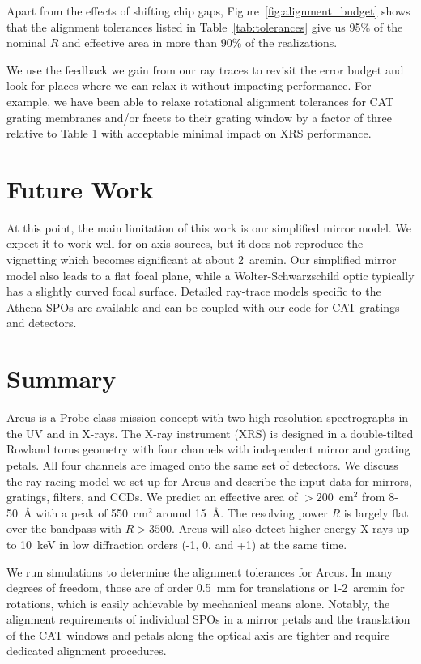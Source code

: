 \documentclass[12pt]{spieman}  %
\begin{document}
\begin{spacing}{2}
Apart from the effects of shifting chip gaps, Figure~\ref{fig:alignment_budget} shows that the alignment tolerances listed in Table~\ref{tab:tolerances} give us 95\% of the nominal $R$ and effective area in more than 90\% of the realizations.

We use the feedback we gain from our ray traces to revisit the error budget and look for places where we can relax it without impacting performance.
For example, we have been able to relaxe rotational alignment tolerances for CAT grating membranes and/or facets to their grating window by a factor of three relative to Table 1 with acceptable minimal impact on XRS performance.

\section{Future Work}
At this point, the main limitation of this work is our simplified mirror model. We expect it to work well for on-axis sources, but it does not reproduce the vignetting which becomes significant at about 2~arcmin. Our simplified mirror model also leads to a flat focal plane, while a Wolter-Schwarzschild optic typically has a slightly curved focal surface. Detailed ray-trace models specific to the Athena SPOs are available\cite{10.1117/12.2232230,10.1117/12.2594461,10.1117/12.2628133} and can be coupled with our code for CAT gratings and detectors.

\section{Summary}
\label{sect:summary}
Arcus is a Probe-class mission concept with two high-resolution spectrographs in the UV and in X-rays. The X-ray instrument (XRS) is designed in a double-tilted Rowland torus geometry with four channels with independent mirror and grating petals. All four channels are imaged onto the same set of detectors. We discuss the ray-racing model we set up for Arcus and describe the input data for mirrors, gratings, filters, and CCDs. We predict an effective area of $>200$~cm$^2$ from 8-50~\AA{} with a peak of 550~cm$^2$ around 15~\AA{}. The resolving power $R$ is largely flat over the bandpass with $R>3500$. Arcus will also detect higher-energy X-rays up to 10~keV in low diffraction orders (-1, 0, and +1) at the same time.

We run simulations to determine the alignment tolerances for Arcus. In many degrees of freedom, those are of order 0.5~mm for translations or 1-2~arcmin for rotations, which is easily achievable by mechanical means alone. Notably, the alignment requirements of individual SPOs in a mirror petals  and the translation of the CAT windows and petals along the optical axis are tighter and require dedicated alignment procedures.







\end{spacing}
\end{document}
